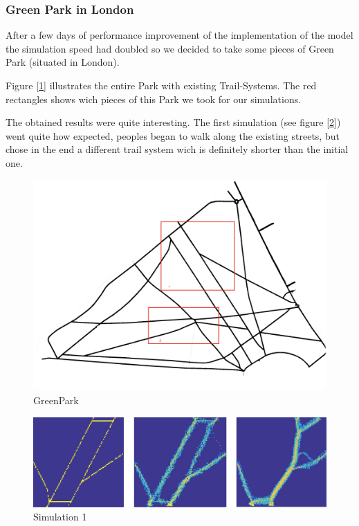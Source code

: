 \documentclass[11pt]{article}
\begin{document}
\subsubsection{Green Park in London}
After a few days of performance improvement of the implementation of the model the simulation speed had doubled so we decided to take some pieces of Green Park (situated in London). 

Figure [\ref{GreenPark}] illustrates the entire Park with existing Trail-Systems. The red rectangles shows wich pieces of this Park we took for our simulations.  

The obtained results were quite interesting. The first simulation (see figure [\ref{GreenPark1}]) went quite how expected, peoples began to walk along the existing streets, but chose in the end a different trail system wich is definitely shorter than the initial one. 

\begin{figure}[H]
        \centering
        \includegraphics[width=\columnwidth]{GreenPark.png}
        \caption{GreenPark}
        \label{GreenPark}
\end{figure}


\begin{figure}[H]
        \centering
        \includegraphics[width=\columnwidth]{GreenPark1.jpg}
        \caption{Simulation 1}
        \label{GreenPark1}
\end{figure}
\end{document}

